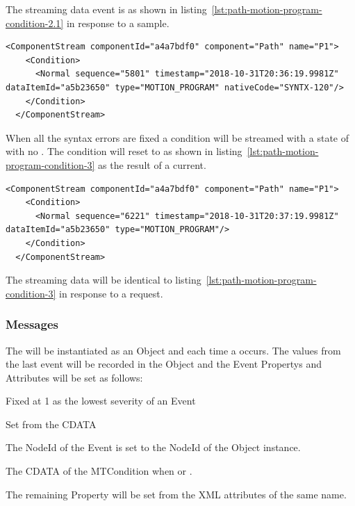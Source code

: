 The streaming data event is as shown in listing~\ref{lst:path-motion-program-condition-2.1} in response to a \gls{sample}.

\begin{lstlisting}[firstnumber=last,escapechar=|,%
    caption={Path Motion Program Syntax Error on Line 120 Normal},label={lst:path-motion-program-condition-2.1}]
  <ComponentStream componentId="a4a7bdf0" component="Path" name="P1">
    <Condition>
      <Normal sequence="5801" timestamp="2018-10-31T20:36:19.9981Z" dataItemId="a5b23650" type="MOTION_PROGRAM" nativeCode="SYNTX-120"/>
    </Condition>
  </ComponentStream>
\end{lstlisting}


When all the syntax errors are fixed a condition will be streamed with a state of  with no . The condition will reset to  as shown in listing~\ref{lst:path-motion-program-condition-3} as the result of a \gls{current}.

\begin{lstlisting}[firstnumber=last,escapechar=|,%
    caption={Path Motion Program Normal},label={lst:path-motion-program-condition-3}]
  <ComponentStream componentId="a4a7bdf0" component="Path" name="P1">
    <Condition>
      <Normal sequence="6221" timestamp="2018-10-31T20:37:19.9981Z" dataItemId="a5b23650" type="MOTION_PROGRAM"/>
    </Condition>
  </ComponentStream>
\end{lstlisting}

The streaming data will be identical to listing~\ref{lst:path-motion-program-condition-3} in response to a  request.

\subsubsection{Messages}

The  will be instantiated as an \gls{Object} and each time a  occurs. The values from the last event will be recorded in the \gls{Object} and the \gls{Event} \glspl{Property} and \glspl{Attribute} will be set as follows: 

\begin{description}[font=\it\bfseries,labelindent=4em,labelwidth=6em,leftmargin=!]    
  \item[Severity] Fixed at 1 as the lowest severity of an \gls{Event}
  \item[Message] Set from the \gls{CDATA}
  \item[Time] 
  \item[NodeId] The \gls{NodeId} of the \gls{Event} is set to the \gls{NodeId} of the  \gls{Object} instance.
  \item[Message] The \gls{CDATA} of the \gls{MTCondition} when  or .
  \item[\ldots] The remaining \gls{Property} will be set from the XML attributes of the same name.
\end{description}

